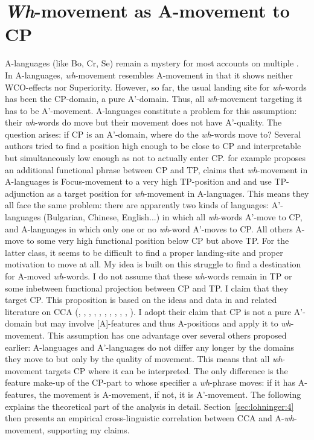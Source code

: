 \documentclass[output=paper,colorlinks,citecolor=brown]{langscibook}
\begin{document}
\section{\textit{Wh}-movement as A-movement to CP}
A-languages (like Bo, Cr, Se) remain a mystery for most accounts on multiple . In A-languages, \textit{wh}-movement resembles A-movement in that it shows neither WCO-effects nor Superiority. However, so far, the usual landing site for \textit{wh}-words has been the CP-domain, a pure A'-domain. Thus, all \textit{wh}-movement targeting it has to be A'-movement. A-languages constitute a problem for this assumption: their \textit{wh}-words do move but their movement does not have A'-quality. The question arises: if CP is an A'-domain, where do the \textit{wh}-words move to? Several authors tried to find a position high enough to be close to CP and interpretable but simultaneously low enough as not to actually enter CP. \citet{citko1998multiple} for example proposes an additional functional phrase between CP and TP, \citet{bovskovic2002multiple} claims that \textit{wh}-movement in A-languages is Focus-movement to a very high TP-position and \citet{rudin1988multiple} and \citet{richards1997} use TP-adjunction as a target position for \textit{wh}-movement in A-languages. This means they all face the same problem: there are apparently two kinds of languages: A'-languages (Bulgarian, Chinese, English...) in which all \textit{wh}-words A'-move to CP, and A-languages in which only one or no \textit{wh}-word A'-moves to CP. All others A-move to some very high functional position below CP but above TP. For the latter class, it seems to be difficult to find a proper landing-site and proper motivation to move at all. My idea is built on this struggle to find a destination for A-moved \textit{wh}-words. I do not assume that these \textit{wh}-words remain in TP or some inbetween functional projection between CP and TP. I claim that they target CP. This proposition is based on the ideas and data in \citet{wurmbrand2018cross} and related literature on CCA (\citealp{tanaka2002raising}, \citealp{csener2008non}, \citealp{takeuchi2010exceptional}, \citealp{alboiu2011case}, \citealp{obata2011feature}, \citealp{vanUrk2015}, \citealp{bondarenko2017ecm}, \citealp{zyman2017p}, \citealp{zyman2018rich}, \citealp{wurmbrand2018cross}, \citealp{fong2019proper}). I adopt their claim that CP is not a pure A'-domain but may involve [A]-features and thus A-positions and apply it to \textit{wh}-movement. This assumption has one advantage over several others proposed earlier: A-languages and A'-languages do not differ any longer by the domains they move to but only by the quality of movement. This means that all \textit{wh}-movement targets CP where it can be interpreted. The only difference is the feature make-up of the CP-part to whose specifier a \textit{wh}-phrase moves: if it has A-features, the movement is A-movement, if not, it is A'-movement. The following explains the theoretical part of the analysis in detail. Section~\ref{sec:lohninger:4} then presents an empirical cross-linguistic correlation between CCA and A-\textit{wh}-movement, supporting my claims.
\end{document}
